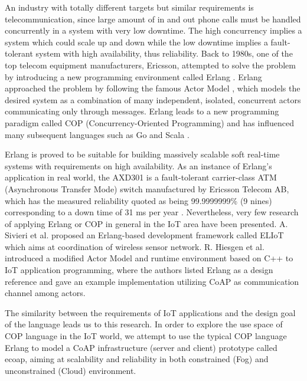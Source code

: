 An industry with totally different targets but similar requirements is telecommunication, since large amount of in and out phone calls must be handled concurrently in a system with very low downtime. The high concurrency implies a system which could scale up and down while the low downtime implies a fault-tolerant system with high availability, thus reliability. Back to 1980s, one of the top telecom equipment manufacturers, Ericsson, attempted to solve the problem by introducing a new programming environment called Erlang \cite{erl}. Erlang approached the problem by following the famous Actor Model \cite{agha1986actors}, which models the desired system as a combination of many independent, isolated, concurrent actors communicating only through messages. Erlang leads to a new programming paradigm called COP (Concurrency-Oriented Programming) \cite{armstrong2003concurrency} and has influenced many subsequent languages such as Go \cite{go} and Scala \cite{scala}.  

Erlang is proved to be suitable for building massively scalable soft real-time systems with requirements on high availability. As an instance of Erlang's application in real world, the AXD301 is a fault-tolerant carrier-class ATM (Asynchronous Transfer Mode) switch manufactured by Ericsson Telecom AB, which has the measured reliability quoted as being 99.9999999\% (9 nines) corresponding to a down time of 31 ms per year \cite{armstrong2003concurrency}. Nevertheless, very few research of applying Erlang or COP in general in the IoT area have been presented. A. Sivieri et al. \cite{Sivieri:2012:DPT:2667049.2667051} proposed an Erlang-based development framework called ELIoT which aims at coordination of wireless sensor network. R. Hiesgen et al. \cite{7034296} introduced a modified Actor Model and runtime environment based on C++ to IoT application programming, where the authors listed Erlang as a design reference and gave an example implementation utilizing CoAP as communication channel among actors.  

The similarity between the requirements of IoT applications and the design goal of the language leads us to this research. In order to explore the use space of COP language in the IoT world, we attempt to use the typical COP language Erlang to model a CoAP infrastructure (server and client) prototype called ecoap, aiming at scalability and reliability in both constrained (Fog) and unconstrained (Cloud) environment.

